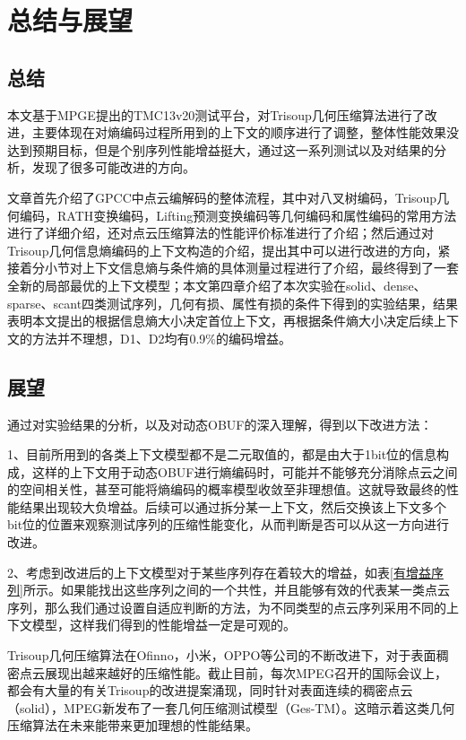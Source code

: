 \documentclass[bachelor,print,msfonts]{xduthesis}
\begin{document}
\mainmatter
\fi

\chapter{总结与展望}
\label{cha:mainmatter}
\section{总结}
本文基于MPGE提出的TMC13v20测试平台，对Trisoup几何压缩算法进行了改进，主要体现在对熵编码过程所用到的上下文的顺序进行了调整，整体性能效果没达到预期目标，但是个别序列性能增益挺大，通过这一系列测试以及对结果的分析，发现了很多可能改进的方向。

文章首先介绍了GPCC中点云编解码的整体流程，其中对八叉树编码，Trisoup几何编码，RATH变换编码，Lifting预测变换编码等几何编码和属性编码的常用方法进行了详细介绍，还对点云压缩算法的性能评价标准进行了介绍；然后通过对Trisoup几何信息熵编码的上下文构造的介绍，提出其中可以进行改进的方向，紧接着分小节对上下文信息熵与条件熵的具体测量过程进行了介绍，最终得到了一套全新的局部最优的上下文模型；本文第四章介绍了本次实验在solid、dense、sparse、scant四类测试序列，几何有损、属性有损的条件下得到的实验结果，结果表明本文提出的根据信息熵大小决定首位上下文，再根据条件熵大小决定后续上下文的方法并不理想，D1、D2均有0.9\%的编码增益。
\section{展望}
通过对实验结果的分析，以及对动态OBUF的深入理解，得到以下改进方法：

1、目前所用到的各类上下文模型都不是二元取值的，都是由大于1bit位的信息构成，这样的上下文用于动态OBUF进行熵编码时，可能并不能够充分消除点云之间的空间相关性，甚至可能将熵编码的概率模型收敛至非理想值。这就导致最终的性能结果出现较大负增益。后续可以通过拆分某一上下文，然后交换该上下文多个bit位的位置来观察测试序列的压缩性能变化，从而判断是否可以从这一方向进行改进。

2、考虑到改进后的上下文模型对于某些序列存在着较大的增益，如表\ref{有增益序列}所示。如果能找出这些序列之间的一个共性，并且能够有效的代表某一类点云序列，那么我们通过设置自适应判断的方法，为不同类型的点云序列采用不同的上下文模型，这样我们得到的性能增益一定是可观的。

Trisoup几何压缩算法在Ofinno，小米，OPPO等公司的不断改进下，对于表面稠密点云展现出越来越好的压缩性能。截止目前，每次MPEG召开的国际会议上，都会有大量的有关Trisoup的改进提案涌现，同时针对表面连续的稠密点云（solid），MPEG新发布了一套几何压缩测试模型（Ges-TM）。这暗示着这类几何压缩算法在未来能带来更加理想的性能结果。


\ifx\allfiles\undefined
\end{document}
